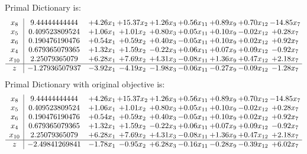 \documentclass[8pt]{article}
\begin{document}
Primal Dictionary is:
\[\begin{array}{c| c c@{\hskip 2pt} c@{\hskip 2pt} c@{\hskip 2pt} c@{\hskip 2pt} c@{\hskip 2pt} c@{\hskip 2pt} c@{\hskip 2pt} }
 x_{8}   &  9.44444444444 & +  4.26 x_{1} & + 15.37 x_{2} & +  1.26 x_{3} & +  0.56 x_{11} & +  0.89 x_{9} & +  0.70 x_{12} & -14.85 x_{7}\\
 x_{5}   &  0.409523809524 & +  1.06 x_{1} & +  1.01 x_{2} & +  0.80 x_{3} & +  0.05 x_{11} & +  0.10 x_{9} & -0.02 x_{12} & +  0.28 x_{7}\\
 x_{6}   &  0.190476190476 & +  0.54 x_{1} & +  0.59 x_{2} & +  0.40 x_{3} & -0.05 x_{11} & +  0.10 x_{9} & +  0.02 x_{12} & +  0.92 x_{7}\\
 x_{4}   &  0.679365079365 & +  1.32 x_{1} & +  1.59 x_{2} & -0.22 x_{3} & +  0.06 x_{11} & +  0.07 x_{9} & +  0.09 x_{12} & -0.92 x_{7}\\
 x_{10}   &  2.25079365079 & +  6.28 x_{1} & +  7.69 x_{2} & +  4.31 x_{3} & -0.08 x_{11} & +  1.36 x_{9} & +  0.47 x_{12} & +  2.18 x_{7}\\
\hline
z    &  -1.27936507937 & -3.92 x_{1} & -4.19 x_{2} & -1.98 x_{3} & -0.06 x_{11} & -0.27 x_{9} & -0.09 x_{12} & -1.28 x_{7}\\
\end{array}\]
Primal Dictionary with original objective is:
\[\begin{array}{c| c c@{\hskip 2pt} c@{\hskip 2pt} c@{\hskip 2pt} c@{\hskip 2pt} c@{\hskip 2pt} c@{\hskip 2pt} c@{\hskip 2pt} }
 x_{8}   &  9.44444444444 & +  4.26 x_{1} & + 15.37 x_{2} & +  1.26 x_{3} & +  0.56 x_{11} & +  0.89 x_{9} & +  0.70 x_{12} & -14.85 x_{7}\\
 x_{5}   &  0.409523809524 & +  1.06 x_{1} & +  1.01 x_{2} & +  0.80 x_{3} & +  0.05 x_{11} & +  0.10 x_{9} & -0.02 x_{12} & +  0.28 x_{7}\\
 x_{6}   &  0.190476190476 & +  0.54 x_{1} & +  0.59 x_{2} & +  0.40 x_{3} & -0.05 x_{11} & +  0.10 x_{9} & +  0.02 x_{12} & +  0.92 x_{7}\\
 x_{4}   &  0.679365079365 & +  1.32 x_{1} & +  1.59 x_{2} & -0.22 x_{3} & +  0.06 x_{11} & +  0.07 x_{9} & +  0.09 x_{12} & -0.92 x_{7}\\
 x_{10}   &  2.25079365079 & +  6.28 x_{1} & +  7.69 x_{2} & +  4.31 x_{3} & -0.08 x_{11} & +  1.36 x_{9} & +  0.47 x_{12} & +  2.18 x_{7}\\
\hline
z    &  -2.49841269841 & -1.78 x_{1} & -0.95 x_{2} & +  6.28 x_{3} & -0.16 x_{11} & -0.28 x_{9} & -0.39 x_{12} & +  6.02 x_{7}\\
\end{array}\]
\end{document}

